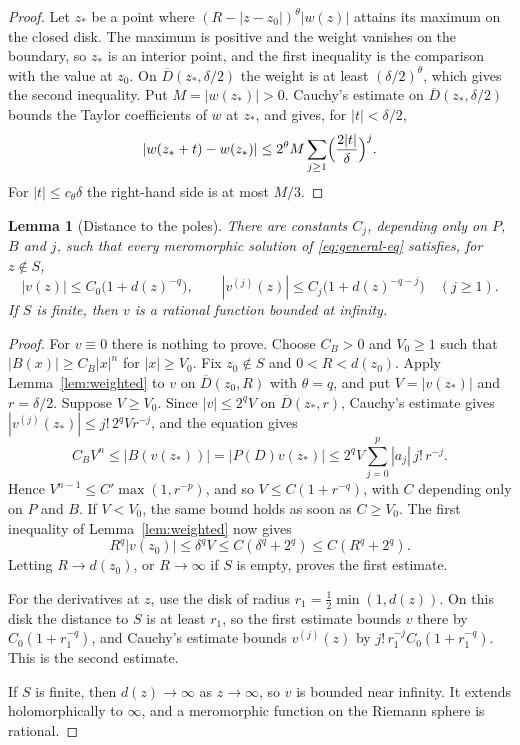 \documentclass[11pt]{article}
\newtheorem{lemma}[theorem]{Lemma}
\theoremstyle{definition}
\theoremstyle{remark}
\numberwithin{equation}{section}
\begin{document}
\begin{proof}
Let \(z_*\) be a point where \((R-|z-z_0|)^\theta|w(z)|\) attains its
maximum on the closed disk. The maximum is positive and the weight
vanishes on the boundary, so \(z_*\) is an interior point, and the
first inequality is the comparison with the value at \(z_0\). On
\(\overline D(z_*,\delta/2)\) the weight is at least
\((\delta/2)^\theta\), which gives the second inequality. Put
\(M=|w(z_*)|>0\). Cauchy's estimate on \(\overline D(z_*,\delta/2)\)
bounds the Taylor coefficients of \(w\) at \(z_*\), and gives, for
\(|t|<\delta/2\),
\[
 |w(z_*+t)-w(z_*)|\le 2^\theta M\sum_{j\ge1}\Bigl(\frac{2|t|}{\delta}\Bigr)^j .
\]
For \(|t|\le c_\theta\delta\) the right-hand side is at most \(M/3\).
\end{proof}

\begin{lemma}[Distance to the poles]\label{lem:distance}
There are constants \(C_j\), depending only on \(P\), \(B\) and \(j\),
such that every meromorphic solution of \eqref{eq:general-eq} satisfies,
for \(z\notin S\),
\begin{equation}\label{eq:distance}
 |v(z)|\le C_0\bigl(1+d(z)^{-q}\bigr),\qquad
 |v^{(j)}(z)|\le C_j\bigl(1+d(z)^{-q-j}\bigr)\quad(j\ge1).
\end{equation}
If \(S\) is finite, then \(v\) is a rational function bounded at
infinity.
\end{lemma}

\begin{proof}
For \(v\equiv0\) there is nothing to prove. Choose \(C_B>0\) and
\(V_0\ge1\) such that \(|B(x)|\ge C_B|x|^n\) for \(|x|\ge V_0\).
Fix \(z_0\notin S\) and \(0<R<d(z_0)\). Apply
Lemma~\ref{lem:weighted} to \(v\) on \(\overline D(z_0,R)\) with
\(\theta=q\), and put \(V=|v(z_*)|\) and \(r=\delta/2\). Suppose
\(V\ge V_0\). Since \(|v|\le2^qV\) on \(\overline D(z_*,r)\), Cauchy's
estimate gives \(|v^{(j)}(z_*)|\le j!\,2^qVr^{-j}\), and the equation
gives
\[
 C_BV^{n}\le|B(v(z_*))|=|P(D)v(z_*)|
 \le 2^qV\sum_{j=0}^{p}|a_j|\,j!\,r^{-j}.
\]
Hence \(V^{n-1}\le C'\max(1,r^{-p})\), and so
\(V\le C(1+r^{-q})\), with \(C\) depending only on \(P\) and \(B\).
If \(V<V_0\), the same bound holds as soon as \(C\ge V_0\). The first inequality of
Lemma~\ref{lem:weighted} now gives
\[
 R^q|v(z_0)|\le \delta^qV\le C(\delta^q+2^q)\le C(R^q+2^q).
\]
Letting \(R\to d(z_0)\), or \(R\to\infty\) if \(S\) is empty, proves the
first estimate.

For the derivatives at \(z\), use the disk of radius
\(r_1=\tfrac12\min(1,d(z))\). On this disk the distance to \(S\) is at
least \(r_1\), so the first estimate bounds \(v\) there by
\(C_0(1+r_1^{-q})\), and Cauchy's estimate bounds \(v^{(j)}(z)\) by
\(j!\,r_1^{-j}C_0(1+r_1^{-q})\). This is the second estimate.

If \(S\) is finite, then \(d(z)\to\infty\) as \(z\to\infty\), so \(v\)
is bounded near infinity. It extends holomorphically to \(\infty\), and
a meromorphic function on the Riemann sphere is rational.
\end{proof}
\end{document}
